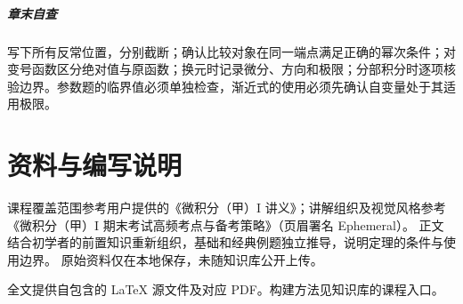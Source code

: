 \documentclass[UTF8,fontset=fandol,12pt,oneside,openany]{ctexrep}
\theoremstyle{definition}
\begin{document}
\paragraph{章末自查} 写下所有反常位置，分别截断；确认比较对象在同一端点满足正确的幂次条件；对变号函数区分绝对值与原函数；换元时记录微分、方向和极限；分部积分时逐项核验边界。参数题的临界值必须单独检查，渐近式的使用必须先确认自变量处于其适用极限。

\chapter*{资料与编写说明}
课程覆盖范围参考用户提供的《微积分（甲）I 讲义》；讲解组织及视觉风格参考
《微积分（甲）I 期末考试高频考点与备考策略》（页眉署名 Ephemeral）。
正文结合初学者的前置知识重新组织，基础和经典例题独立推导，说明定理的条件与使用边界。
原始资料仅在本地保存，未随知识库公开上传。

全文提供自包含的 LaTeX 源文件及对应 PDF。构建方法见知识库的课程入口。
\end{document}
